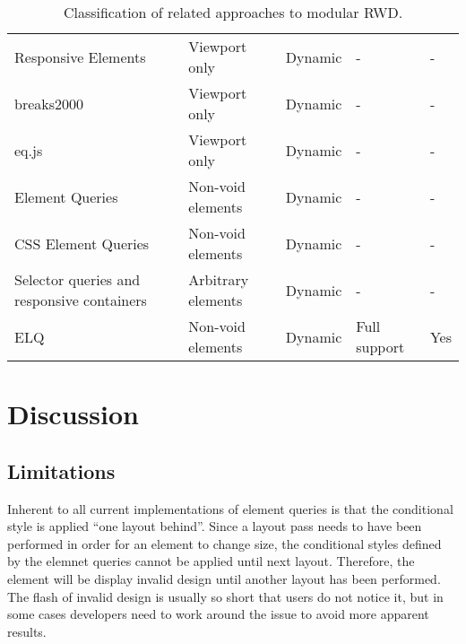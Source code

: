 \documentclass{acm_proc_article-sp}
\newcommand{\elq}{ELQ}
\begin{document}
\begin{table*}[ht!]
\begin{tabular}[t]{ p{3cm} l l l l l }
       Responsive Elements \cite{eq_imp_responsive-elements-2}    &                                   &   Viewport only &                 Dynamic &    -                  & -  \\ 
       breaks2000 \cite{eq_imp_breaks2000}                        &                                   &   Viewport only &                 Dynamic &    -                  & -  \\
       eq.js \cite{eq_imp_eqjs}                                   &                                   &   Viewport only &                 Dynamic &    -                  & -  \\
       Element Queries \cite{eq_imp_element-queries}              &                                   &   Non-void elements &             Dynamic &    -                  & -  \\
       CSS Element Queries \cite{eq_imp_css-element-queries}      &                                   &   Non-void elements &             Dynamic &    -                  & -  \\
       Selector queries and responsive containers \cite{eq_imp_selector_queries}                    & &   Arbitrary elements &            Dynamic &    -                  & -  \\
       \elq{}                                                                                       & &   Non-void elements &             Dynamic &    Full support       & Yes \\
    \end{tabular}
    \caption{Classification of related approaches to modular RWD.}
    \label{table:approaches-classifications}
  \end{table*}

\section{Discussion}\label{sec:discussion}

  \subsection{Limitations}
    Inherent to all current implementations of element queries is that the conditional style is applied ``one layout behind''.
    Since a layout pass needs to have been performed in order for an element to change size, the conditional styles defined by the elemnet queries cannot be applied until next layout.
    Therefore, the element will be display invalid design until another layout has been performed.
    The flash of invalid design is usually so short that users do not notice it, but in some cases developers need to work around the issue to avoid more apparent results.
\end{document}
